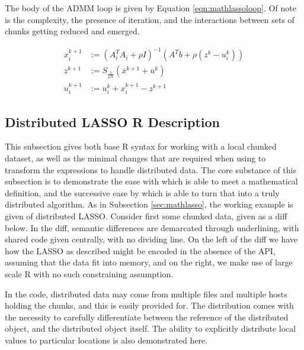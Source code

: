 \documentclass[letterpaper, inpress]{jds} %
\begin{document}
The body of the ADMM loop is given by Equation \ref{eqn:mathlassoloop}.
Of note is the complexity, the presence of iteration, and the interactions between sets of chunks getting reduced and emerged.

\begin{equation}\label{eqn:mathlassoloop}
    \begin{aligned}
        x_i^{k+1} &:= (A_i^T A_i + \rho I)^{-1}(A^T b + \rho(z^k - u_i^k))\\
        z^{k+1} &:= S_\frac{\lambda}{\rho N} (\overline{x}^{k+1} + \overline{u}^k) \\
        u_i^{k+1} &:= u_i^k + x_i^{k+1} - z^{k+1}
    \end{aligned} 
\end{equation}

\subsection{Distributed LASSO R Description}\label{sec:rlasso}

This subsection gives both base R syntax for working with a local chunked dataset, as well as the minimal changes that are required when using  to transform the expressions to handle distributed data.
The core substance of this subsection is to demonstrate the ease with which  is able to meet a mathematical definition, and the successive ease by which  is able to turn that into a truly distributed algorithm.
As in Subsection \ref{sec:mathlasso}, the working example is given of distributed LASSO.
Consider first some chunked data, given as a diff below.
In the diff, semantic differences are demarcated through underlining, with shared code given centrally, with no dividing line.
On the left of the diff we have how the LASSO as described might be encoded in the absence of the API, assuming that the data fit into memory, and on the right, we make use of large scale R with no such constraining assumption.

In the  code, distributed data may come from multiple files and multiple hosts holding the chunks, and this is easily provided for.
The distribution comes with the necessity to carefully differentiate between the reference of the distributed object, and the distributed object itself.
The ability to explicitly distribute local values to particular locations is also demonstrated here.
\end{document}
